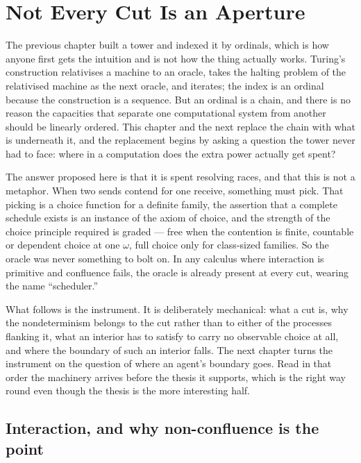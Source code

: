 \chapter{Not Every Cut Is an Aperture}
\label{ch:apr}

\noindent
The previous chapter built a tower and indexed it by ordinals, which is how anyone
first gets the intuition and is not how the thing actually works. Turing's
construction relativises a machine to an oracle, takes the halting problem of the
relativised machine as the next oracle, and iterates; the index is an ordinal because
the construction is a sequence. But an ordinal is a chain, and there is no reason the
capacities that separate one computational system from another should be linearly
ordered. This chapter and the next replace the chain with what is underneath it, and
the replacement begins by asking a question the tower never had to face: where in a
computation does the extra power actually get spent?

The answer proposed here is that it is spent resolving races, and that this is not a
metaphor. When two sends contend for one receive, something must pick. That picking is
a choice function for a definite family, the assertion that a complete schedule exists
is an instance of the axiom of choice, and the strength of the choice principle
required is graded --- free when the contention is finite, countable or dependent
choice at one $\omega$, full choice only for class-sized families. So the oracle was
never something to bolt on. In any calculus where interaction is primitive and
confluence fails, the oracle is already present at every cut, wearing the name
``scheduler.''

What follows is the instrument. It is deliberately mechanical: what a cut is, why the
nondeterminism belongs to the cut rather than to either of the processes flanking it,
what an interior has to satisfy to carry no observable choice at all, and where the
boundary of such an interior falls. The next chapter turns the instrument on the
question of where an agent's boundary goes. Read in that order the machinery arrives
before the thesis it supports, which is the right way round even though the thesis is
the more interesting half.

\bigskip
\section{Interaction, and why non-confluence is the point}\label{ndo:sec:interaction}

